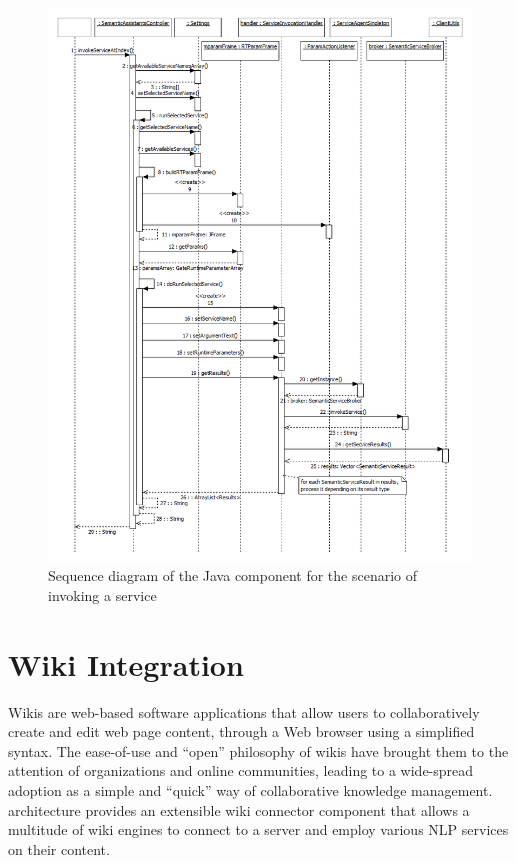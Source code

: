 \begin{figure}[htb]
  \centering
  \includegraphics[totalheight=0.8\textheight]{pictures/mozilla_development_notes_java_component_sequence_diagram_invoke_service.png}
  \caption{Sequence diagram of the Java component for the scenario of invoking a service}
  \label{fig:mozilla_development_notes_java_component_sequence_diagram_invoke_service}
\end{figure}

\section{Wiki Integration}
Wikis are web-based software applications that allow users to collaboratively create and edit web page content, through a Web browser using a simplified syntax. The ease-of-use and ``open'' philosophy of wikis have brought them to the attention of organizations and online communities, leading to a wide-spread adoption as a simple and ``quick'' way of collaborative knowledge management. \sa architecture provides an extensible wiki connector component that allows a multitude of wiki engines to connect to a \sa server and employ various NLP services on their content.

